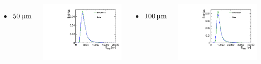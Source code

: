 \begin{frame}
  \begin{columns}
    \begin{itemize}
    \item $50\,\upmu\mathrm{m}$
    \end{itemize}
    \centering
    \includegraphics[width=\textwidth]{../figures/TestBeam/50micron_Edep.pdf}

    \begin{itemize}
    \item $100\,\upmu\mathrm{m}$
    \end{itemize}
    \centering
    \includegraphics[width=\textwidth]{../figures/TestBeam/100micron_Edep.pdf}


\end{columns}
\end{frame}
